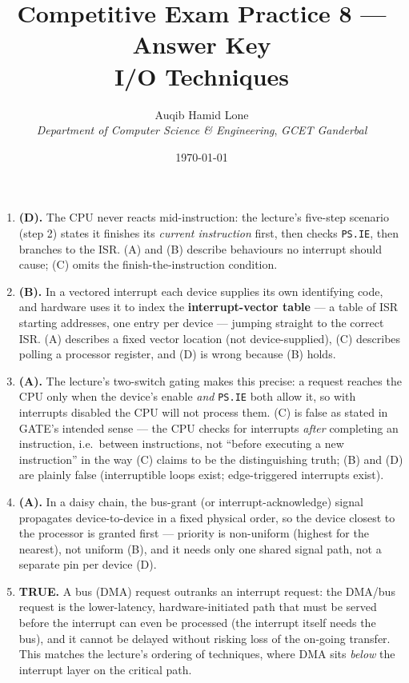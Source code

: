 \documentclass[11pt]{article}
\title{Competitive Exam Practice 8 --- Answer Key\\\large I/O Techniques}
\author{Auqib Hamid Lone\\[0.3em]
  \emph{Department of Computer Science \& Engineering}, \emph{GCET Ganderbal}}
\date{\today}
\begin{document}
\maketitle

\begin{enumerate}
\item[\textbf{Q1}] \textbf{(D).} The CPU never reacts mid-instruction: the lecture's five-step scenario (step 2) states it finishes its \emph{current instruction} first, then checks \texttt{PS.IE}, then branches to the ISR. (A) and (B) describe behaviours no interrupt should cause; (C) omits the finish-the-instruction condition.

\item[\textbf{Q2}] \textbf{(B).} In a vectored interrupt each device supplies its own identifying code, and hardware uses it to index the \textbf{interrupt-vector table} --- a table of ISR starting addresses, one entry per device --- jumping straight to the correct ISR. (A) describes a fixed vector location (not device-supplied), (C) describes polling a processor register, and (D) is wrong because (B) holds.

\item[\textbf{Q3}] \textbf{(A).} The lecture's two-switch gating makes this precise: a request reaches the CPU only when the device's enable \emph{and} \texttt{PS.IE} both allow it, so with interrupts disabled the CPU will not process them. (C) is false as stated in GATE's intended sense --- the CPU checks for interrupts \emph{after} completing an instruction, i.e.\ between instructions, not ``before executing a new instruction'' in the way (C) claims to be the distinguishing truth; (B) and (D) are plainly false (interruptible loops exist; edge-triggered interrupts exist).

\item[\textbf{Q4}] \textbf{(A).} In a daisy chain, the bus-grant (or interrupt-acknowledge) signal propagates device-to-device in a fixed physical order, so the device closest to the processor is granted first --- priority is non-uniform (highest for the nearest), not uniform (B), and it needs only one shared signal path, not a separate pin per device (D).

\item[\textbf{Q5}] \textbf{TRUE.} A bus (DMA) request outranks an interrupt request: the DMA/bus request is the lower-latency, hardware-initiated path that must be served before the interrupt can even be processed (the interrupt itself needs the bus), and it cannot be delayed without risking loss of the on-going transfer. This matches the lecture's ordering of techniques, where DMA sits \emph{below} the interrupt layer on the critical path.


\end{enumerate}
\end{document}
